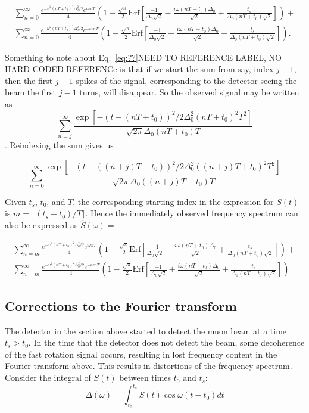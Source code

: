 \begin{gather}
\sum^{\infty}_{n=0}\frac{e^{-\omega^2(nT+t_0)^2\Delta^2_0/2}e^{i\omega nT}}{4}\left(1-\frac{\sqrt{\pi}}{2}\text{Erf}\left[\frac{-1}{\Delta_0\sqrt{2}}-\frac{i\omega (nT+t_0)\Delta_0}{\sqrt{2}}+\frac{t_s}{\Delta_0(nT+t_0)\sqrt{2}}\right]\right)+ \nonumber \\
\sum^{\infty}_{n=0}\frac{e^{-\omega^2(nT+t_0)^2\Delta^2_0/2}e^{-i\omega nT}}{4}\left(1-\frac{\sqrt{\pi}}{2}\text{Erf}\left[\frac{-1}{\Delta_0\sqrt{2}}+\frac{i\omega (nT+t_0)\Delta_0}{\sqrt{2}}+\frac{t_s}{\Delta_0(nT+t_0)\sqrt{2}}\right]\right).
\end{gather}

Something to note about Eq.~\ref{eq:??}NEED TO REFERENCE LABEL, NO HARD-CODED REFERENCe  
is that if we start the sum from say, index $j-1$, then the first $j-1$ spikes of the signal, 
corresponding to the detector seeing the beam the first $j-1$ turns, will disappear. 
So the observed signal may be written as 
\[\sum^{\infty}_{n=j}\frac{\exp[-(t-(nT+t_0))^2/2\Delta^2_0(nT+t_0)^2T^2]}{\sqrt{2\pi}\Delta_0(nT+t_0)T}\]. 
Reindexing the sum gives us 

\begin{equation}
\sum^{\infty}_{n=0}\frac{\exp[-(t-((n+j)T+t_0))^2/2\Delta^2_0((n+j)T+t_0)^2T^2]}{\sqrt{2\pi}\Delta_0((n+j)T+t_0)T}
\end{equation}

Given $t_s$, $t_0$, and $T$, the corresponding starting index in the expression for $S(t)$ is $m=\lceil{(t_s-t_0)/T}\rceil$. Hence the immediately observed frequency spectrum can also be expressed as $\hat{S}(\omega)=$ 

\begin{gather}
\sum^{\infty}_{n=m}\frac{e^{-\omega^2(nT+t_0)^2\Delta^2_0/2}e^{i\omega nT}}{4}\left(1-\frac{\sqrt{\pi}}{2}\text{Erf}\left[\frac{-1}{\Delta_0\sqrt{2}}-\frac{i\omega (nT+t_0)\Delta_0}{\sqrt{2}}+\frac{t_s}{\Delta_0(nT+t_0)\sqrt{2}}\right]\right)+ \nonumber \\
\sum^{\infty}_{n=m}\frac{e^{-\omega^2(nT+t_0)^2\Delta^2_0/2}e^{-i\omega nT}}{4}\left(1-\frac{\sqrt{\pi}}{2}\text{Erf}\left[\frac{-1}{\Delta_0\sqrt{2}}+\frac{i\omega (nT+t_0)\Delta_0}{\sqrt{2}}+\frac{t_s}{\Delta_0(nT+t_0)\sqrt{2}}\right]\right)
\end{gather}

\subsection{Corrections to the Fourier transform} The detector in the section above started to detect the muon beam at a time $t_s>t_0$. In the time that the detector does not detect the beam, some decoherence of the fast rotation signal occurs, resulting in lost frequency content in the Fourier transform above. This results in distortions of the frequency spectrum.  Consider the integral of $S(t)$ between times $t_0$ and $t_s$: 
\begin{equation}
\Delta(\omega)=\int^{t_s}_{t_0}S(t)\cos\omega(t-t_0)dt
\end{equation}

